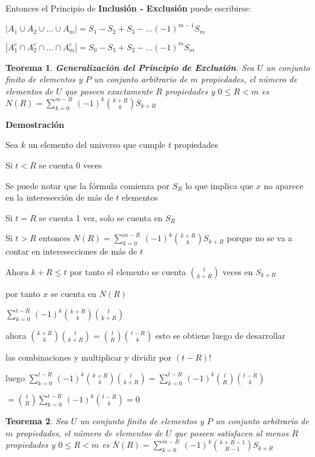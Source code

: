 \documentclass[a4paper,12pt]{report}
\newtheorem*{teo}{Teorema}
\begin{document}
Entonces el Principio de \textbf{Inclusión - Exclusión} puede escribirse:

$|A_1\cup A_2\cup \dots \cup A_m| = S_1 - S_2 + S_3 - \dots (-1)^{m-1}S_m$

$|A_1^c\cap A_2^c\cap \dots \cap A_m^c| = S_0 - S_1 + S_2 - \dots (-1)^{m}S_m$

\begin{teo}
 \textbf{Generalización del Principio de Exclusión}. Sea $U$ un conjunto finito de elementos y $P$ un conjunto arbitrario de $m$ propiedades, el número de elementos de $U$ que poseen exactamente $R$ propiedades y $0\leq R < m$ es
 $N(R) = \sum^{m-R}_{k=0}\, (-1)^k$${k+R}\choose{k}$$S_{k+R}$
\end{teo}

\textbf{Demostración}

Sea $k$ un elemento del universo que cumple $t$ propiedades

Si $t<R$ se cuenta 0 veces

Se puede notar que la fórmula comienza por $S_R$ lo que implica que $x$ no aparece en la interesección de más de $t$ elementos

Si $t=R$ se cuenta 1 vez, solo se cuenta en $S_R$

Si $t>R$ entonces $N(R) = \sum^{m-R}_{k=0}\, (-1)^k$${k+R}\choose{k}$$S_{k+R}$ porque no se va a contar en interesecciones de más de $t$

Ahora $k+R\leq t$ por tanto el elemento se cuenta $t\choose{k+R}$ veces en $S_{k+R}$ 

por tanto $x$ se cuenta en $N(R)$
 
$\sum^{t-R}_{k=0}\, (-1)^k$${k+R}\choose{k}$${t}\choose{k+R}$

ahora ${k+R}\choose{k}$${t}\choose{k+R}$$=$${t}\choose{R}$${t-R}\choose{k}$ esto se obtiene luego de desarrollar 

las combinaciones y multiplicar y dividir por $(t-R)!$

luego $\sum^{t-R}_{k=0}\, (-1)^k$${k+R}\choose{k}$${t}\choose{k+R}$$=$$\sum^{t-R}_{k=0}\, (-1)^k$${t}\choose{R}$${t-R}\choose{k}$

$=$${t}\choose{R}$$\sum^{t-R}_{k=0}\, (-1)^k$${t-R}\choose{k}$$=0$

\begin{teo}
  Sea $U$ un conjunto finito de elementos y $P$ un conjunto arbitrario de $m$ propiedades, el número de elementos de $U$ que poseen satisfacen al menos $R$ propiedades y $0\leq R < m$ es
 $\bar{N}(R) = \sum^{m-R}_{k=0}\, (-1)^k$${k+R-1}\choose{R-1}$$S_{k+R}$
\end{teo}
\end{document}
